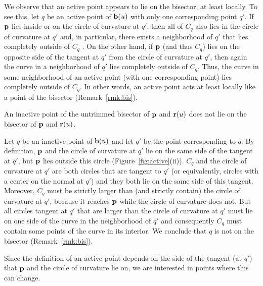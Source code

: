 \begin{rmk}
\label{r:active}
We observe that an active point appears to lie on the bisector,
at least locally.
To see this, 
let $q$ be an active point of ${\bf b}(u)$ with only one corresponding
point $q'$.
If ${\bf p}$ lies inside or on the circle of curvature at $q'$,
then all of $C_q$ also lies in the circle of curvature at $q'$ 
and, in particular, there exists a neighborhood of $q'$ 
that lies completely outside of $C_q$ \cite[p. 176]{H52}.
On the other hand, if ${\bf p}$ (and thus $C_q$) lies on the opposite side 
of the tangent at $q'$ from the circle of curvature at $q'$,
then again the curve in a neighborhood of $q'$ lies completely outside of
$C_q$.
Thus, the curve in some neighborhood of an active point (with one corresponding
point) lies completely outside of $C_q$.
In other words, an active point acts at least locally
like a point of the bisector (Remark~\ref{rmk:bis}).
\end{rmk}

\begin{propn}
An inactive point of the untrimmed bisector of ${\bf p}$ and ${\bf r}(u)$
does not lie on the bisector of ${\bf p}$ and ${\bf r}(u)$.
\end{propn}
\prf
Let $q$ be an inactive point of ${\bf b}(u)$ 
and let $q'$ be the point corresponding to $q$.
By definition, ${\bf p}$ and the circle of curvature at $q'$ lie
on the same side of the tangent at $q'$, but ${\bf p}$ lies outside this
circle (Figure~\ref{fig:active}(ii)).
$C_q$ and the circle of curvature at $q'$ are both circles that are
tangent to $q'$ (or equivalently, circles with a center on the normal at $q'$)
and they both lie on the same side of this tangent.
Moreover, $C_q$ must be strictly larger than (and strictly contain)
the circle of curvature at $q'$, because it reaches ${\bf p}$ while the circle
of curvature does not.
But all circles tangent at $q'$ that are larger than the circle of curvature
at $q'$ must lie on one side of the curve in the neighborhood of $q'$
\cite[p. 176]{H52} and consequently $C_q$ must contain some points of the curve
in its interior.
We conclude that $q$ is not on the bisector (Remark~\ref{rmk:bis}).
\QED

Since the definition of an active point depends on the side of the tangent
(at $q'$) that ${\bf p}$ and the circle of curvature lie on, 
we are interested in points where this can change.

